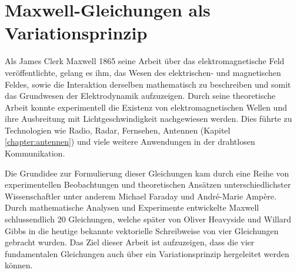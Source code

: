 %
%
%
%

\chapter{Maxwell-Gleichungen als Variationsprinzip\label{chapter:maxwell}}
\begin{refsection}

Als James Clerk Maxwell 1865 seine Arbeit über das elektromagnetische Feld veröffentlichte, gelang es ihm, das Wesen des elektrischen- und magnetischen Feldes, sowie die Interaktion derselben mathematisch zu beschreiben und somit das Grundwesen der Elektrodynamik aufzuzeigen.
Durch seine theoretische Arbeit konnte experimentell die Existenz von elektromagnetischen Wellen und ihre Ausbreitung mit Lichtgeschwindigkeit nachgewiesen werden.
Dies führte zu Technologien wie Radio, Radar, Fernsehen, Antennen (Kapitel \ref{chapter:antennen}) und viele weitere Anwendungen in der drahtlosen Kommunikation. 

Die Grundidee zur Formulierung dieser Gleichungen kam durch eine Reihe von experimentellen Beobachtungen und theoretischen Ansätzen unterschiedlichster Wissenschaftler unter anderem Michael Faraday und André-Marie Ampère.
Durch mathematische Analysen und Experimente entwickelte Maxwell schlussendlich 20 Gleichungen, welche später von Oliver Heavyside und Willard Gibbs in die heutige bekannte vektorielle Schreibweise von vier Gleichungen gebracht wurden.
Das Ziel dieser Arbeit ist aufzuzeigen, dass die vier fundamentalen Gleichungen  auch über ein Variationsprinzip hergeleitet werden können.







%
%
%
%


\printbibliography[heading=subbibliography]

\end{refsection}

